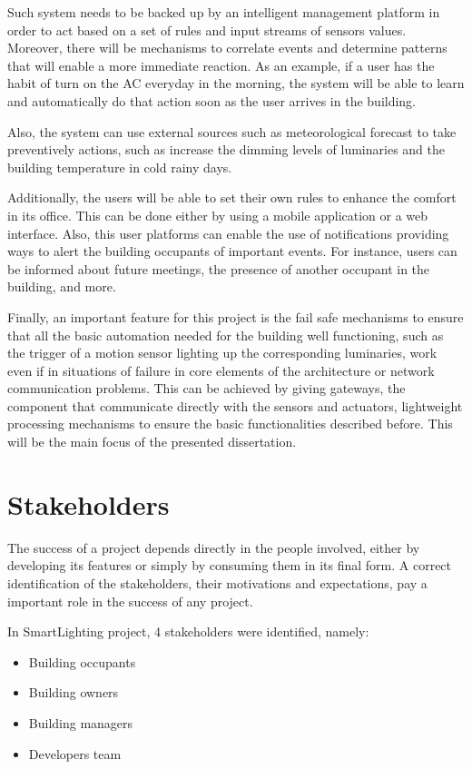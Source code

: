 Such system needs to be backed up by an intelligent management platform in order to act based on a set of rules and input streams of sensors values. Moreover, there will be mechanisms to correlate events and determine patterns that will enable a more immediate reaction. As an example, if a user has the habit of turn on the AC everyday in the morning, the system will be able to learn and automatically do that action soon as the user arrives in the building. 

Also, the system can use external sources such as meteorological forecast to take preventively actions, such as increase the dimming levels of luminaries and the building temperature in cold rainy days.

Additionally, the users will be able to set their own rules to enhance the comfort in its office. This can be done either by using a mobile application or a web interface. Also, this user platforms can enable the use of notifications providing ways to alert the building occupants of important events. For instance, users can be informed about future meetings, the presence of another occupant in the building, and more.

Finally, an important feature for this project is the fail safe mechanisms to ensure that all the basic automation needed for the building well functioning, such as the trigger of a motion sensor lighting up the corresponding luminaries, work even if in situations of failure in core elements of the architecture or network communication problems. This can be achieved by giving gateways, the component that communicate directly with the sensors and actuators, lightweight processing mechanisms to ensure the basic functionalities described before. This will be the main focus of the presented dissertation.


\section{Stakeholders}
\label{Architecture:Stakeholders}

The success of a project depends directly in the people involved, either by developing its features or simply by consuming them in its final form. A correct identification of the stakeholders, their motivations and expectations, pay a important role in the success of any project. 

In SmartLighting project, 4 stakeholders were identified, namely:

\begin{itemize}
	\item Building occupants
	\item Building owners
	\item Building managers
	\item Developers team
\end{itemize}


